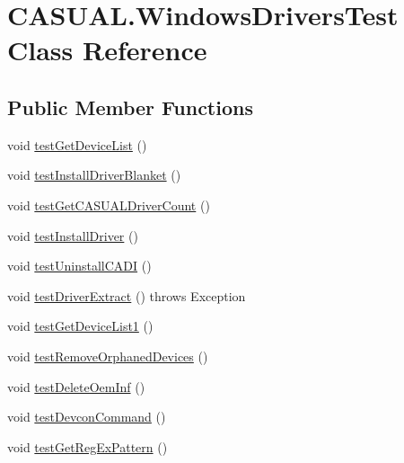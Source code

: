 \hypertarget{classCASUAL_1_1WindowsDriversTest}{\section{C\-A\-S\-U\-A\-L.\-Windows\-Drivers\-Test Class Reference}
\label{classCASUAL_1_1WindowsDriversTest}
}
\subsection*{Public Member Functions}
\begin{DoxyCompactItemize}
\item 
void \hyperlink{classCASUAL_1_1WindowsDriversTest_a5b5492e004f3a3ecfc89e7da987b7b1f}{test\-Get\-Device\-List} ()
\item 
void \hyperlink{classCASUAL_1_1WindowsDriversTest_a0fcfb361be37bbe38a3ed567a2f2e9ff}{test\-Install\-Driver\-Blanket} ()
\item 
void \hyperlink{classCASUAL_1_1WindowsDriversTest_a7d0eb2445956c0eb0cc2579f8cdd1b82}{test\-Get\-C\-A\-S\-U\-A\-L\-Driver\-Count} ()
\item 
void \hyperlink{classCASUAL_1_1WindowsDriversTest_a97f0b7292ec014166377a24e1a22e76f}{test\-Install\-Driver} ()
\item 
void \hyperlink{classCASUAL_1_1WindowsDriversTest_aa2f3127469f2e98fbcf64ab851f0d615}{test\-Uninstall\-C\-A\-D\-I} ()
\item 
void \hyperlink{classCASUAL_1_1WindowsDriversTest_a59bee677febe65c4c61568d367a1322e}{test\-Driver\-Extract} ()  throws Exception 
\item 
void \hyperlink{classCASUAL_1_1WindowsDriversTest_a30c6715f0301b8b4acd07eee4c478c61}{test\-Get\-Device\-List1} ()
\item 
void \hyperlink{classCASUAL_1_1WindowsDriversTest_aadbc04e8c1bb02ebb90245d38cab3e76}{test\-Remove\-Orphaned\-Devices} ()
\item 
void \hyperlink{classCASUAL_1_1WindowsDriversTest_af0236ff43bc50005fefbf4a8021735aa}{test\-Delete\-Oem\-Inf} ()
\item 
void \hyperlink{classCASUAL_1_1WindowsDriversTest_a9d5a6049347a308cc0d2b296f62f9dd7}{test\-Devcon\-Command} ()
\item 
void \hyperlink{classCASUAL_1_1WindowsDriversTest_ad5c89db2b911b8a381e332b2db56af3b}{test\-Get\-Reg\-Ex\-Pattern} ()
\end{DoxyCompactItemize}
